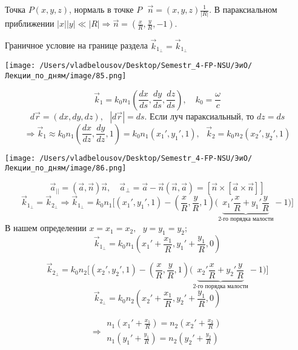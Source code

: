 \documentclass[12pt, a4paper]{report}
\begin{document}
Точка \( P (x,y,z) \), нормаль в точке \( P \text{ } \vec{n }  = \displaystyle (x,y,z )\frac{1}{|R|}  \). В параксиальном приближении \( \displaystyle  |x| |y| \ll |R| \Rightarrow \vec{n }  = (\frac{x}{R } , \frac{y}{R } , - 1 )\).

Граничное условие на границе раздела \( \vec{k } _{1_{\perp}  } = \vec{k}_{1_{\perp} }    \) 

\begin{center}
    \texttt{[image: /Users/vladbelousov/Desktop/Semestr\_4-FP-NSU/ЭиО/Лекции\_по\_дням/image/85.png]}
\end{center}  

\[ \vec{k }  _1 = k_0 n_1 \left( \frac{dx }{ds } , \frac{dy}{ds }  , \frac{dz}{ds}   \right)  , \quad k_0 = \frac{\omega}{c } \] 
\[ d \vec{r }  = (dx , dy ,dz ) , \text{ }  |d \vec{r }  | = ds. \text{ Если луч параксиальный, то } dz = ds  \]  
\[\Rightarrow \vec{k}_1 \approx k_0 n_1 \displaystyle \left( \frac{dx}{dz }  , \frac{dy}{dz } , 1     \right) = k_0 n_1 (x_1 ' , y_1 ', 1 ) , \text{ }  \vec{k }  _2 = k_0 n_2 (x_2' ,y_2' , 1)   \]  
\begin{center}
    \texttt{[image: /Users/vladbelousov/Desktop/Semestr\_4-FP-NSU/ЭиО/Лекции\_по\_дням/image/86.png]}
\end{center}  
\[ \vec{a} _{||} = (\vec{a } , \vec{n } )\vec{n } ,\quad  \vec{a } _{\perp } = \vec{a }  - \vec{n } (\vec{n } , \vec{a }  ) = [\vec{n } \times  [\vec{ a } \times  \vec{n} ]]   \] 
\[ \vec{k }  _{1_{\perp } } = \vec{k }  _{2_{\perp } } \Rightarrow \vec{k}_{1_{\perp } } = k_0 n_1 \bigg[ (x_1 ' , y_1 ' , 1 ) - \left( \frac{x}{R } , \frac{y}{R } , 1  \right) \bigg(\underbrace{ x_1 ' \frac{x}{R }  + y_1 ' \frac{y}{R} }_{\text{2-го порядка малости}}- 1  \bigg)\bigg]   \] 
В нашем определении \( x = x_1 = x_2 , \text{ }  y = y_1 = y_2 ; \) 
\[ \vec{k }  _{1_{\perp } } = k_0 n_1 \left( x_1 ' + \frac{x_1}{R }  , y_1 ' + \frac{y_1}{R },0  \right)  \] 

\[\vec{k}_{2_{\perp } } = k_0 n_2 \bigg[ (x_2 ' , y_2 ' , 1 ) - \left( \frac{x}{R } , \frac{y}{R } , 1  \right) \bigg(\underbrace{ x_2 ' \frac{x}{R }  + y_2 ' \frac{y}{R} }_{\text{2-го порядка малости}}- 1  \bigg)\bigg]   \] 
\[ \vec{k }  _{2_{\perp } } = k_0 n_2 \left( x_2 ' + \frac{x_1}{R }  , y_2 ' + \frac{y_1}{R },0  \right)  \] 

\[ \Rightarrow \begin{aligned}
    n_1 \left( x_1' + \frac{x_1}{R }  \right) = n_2 \left(  x_2 ' + \frac{x_2}{R}  \right) \\
    n_1 \left( y_1' + \frac{y_1}{R }  \right) = n_2 \left(  y_2 ' + \frac{y_2}{R}  \right)
\end{aligned}\] 
\end{document}
